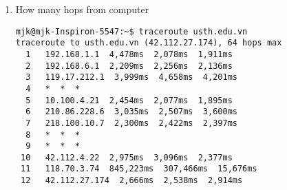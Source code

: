\documentclass{article}
\begin{document}
\begin{enumerate}
\item How many hops from computer
\begin{verbatim}
mjk@mjk-Inspiron-5547:~$ traceroute usth.edu.vn
traceroute to usth.edu.vn (42.112.27.174), 64 hops max
  1   192.168.1.1  4,478ms  2,078ms  1,911ms 
  2   192.168.6.1  2,209ms  2,256ms  2,136ms 
  3   119.17.212.1  3,999ms  4,658ms  4,201ms 
  4   *  *  * 
  5   10.100.4.21  2,454ms  2,077ms  1,895ms 
  6   210.86.228.6  3,035ms  2,507ms  3,600ms 
  7   218.100.10.7  2,300ms  2,422ms  2,397ms 
  8   *  *  * 
  9   *  *  * 
 10   42.112.4.22  2,975ms  3,096ms  2,377ms 
 11   118.70.3.74  845,223ms  307,466ms  15,676ms 
 12   42.112.27.174  2,666ms  2,538ms  2,914ms 
\end{verbatim}

\end{enumerate}
\end{document}
